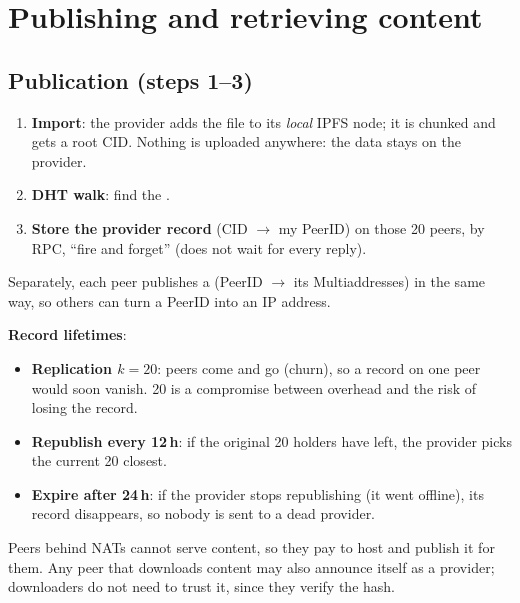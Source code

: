 \section{Publishing and retrieving content}


\subsection{Publication (steps 1--3)}
\begin{enumerate}
  \item[(1)]\textbf{Import}: the provider adds the file to its \emph{local} IPFS node; it is chunked and gets a root CID. Nothing is uploaded anywhere: the data
        stays on the provider.
  \item[(2)]\textbf{DHT walk}: find the .
  \item[(3)]\textbf{Store the provider record} (CID $\to$ my PeerID) on those 20 peers, by RPC, ``fire and forget'' (does not wait for every reply).
\end{enumerate}
Separately, each peer publishes a  (PeerID $\to$ its Multiaddresses) in the same way, so others can turn a PeerID into an IP address.

\textbf{Record lifetimes}:
\begin{itemize}
  \item \textbf{Replication $k = 20$}: peers come and go (churn), so a record on one peer would soon vanish. 20 is a compromise between overhead and the risk of losing the record.
  \item \textbf{Republish every 12\,h}: if the original 20 holders have left, the provider picks the current 20 closest.
  \item \textbf{Expire after 24\,h}: if the provider stops republishing (it went offline), its record disappears, so nobody is sent to a dead provider.
\end{itemize}
Peers behind NATs cannot serve content, so they pay  to host and publish it for them. Any peer that downloads content may also announce itself as a
provider; downloaders do not need to trust it, since they verify the hash.


